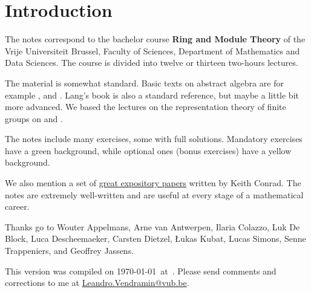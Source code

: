 \thispagestyle{plain}

\section*{Introduction}

The notes correspond to the bachelor 
course \textbf{Ring and Module Theory} of the 
Vrije Universiteit Brussel, 
Faculty of Sciences, 
Department of Mathematics and Data Sciences. The course
is divided into twelve or thirteen two-hours lectures. 

The material is somewhat standard. Basic texts on abstract algebra
are for example \cite{MR1129886}, \cite{MR2286236} and \cite{MR600654}. 
Lang's book \cite{MR783636} is also a standard reference, but 
maybe a little bit more advanced. 
We based the lectures on the representation theory of finite
groups on \cite{MR0450380} and 
\cite{MR2867444}. 

The notes include many exercises, some with full solutions. Mandatory exercises have a green background, while optional ones (bonus exercises) have a yellow background.

We also mention a set of \href{https://kconrad.math.uconn.edu/blurbs/}{great expository papers} written 
by Keith Conrad. 
The notes are extremely well-written and are useful at  
every stage of a mathematical career. 


Thanks go to Wouter Appelmans, Arne van Antwerpen, Ilaria Colazzo, Luk De Block, 
Luca Descheemaeker, Carsten Dietzel, {\L}ukas Kubat, Lucas Simons, Senne Trappeniers, 
and Geoffrey Jassens. 

This version 
was compiled on \today~at~\currenttime. 
Please send comments and corrections to me at \url{Leandro.Vendramin@vub.be}. 


